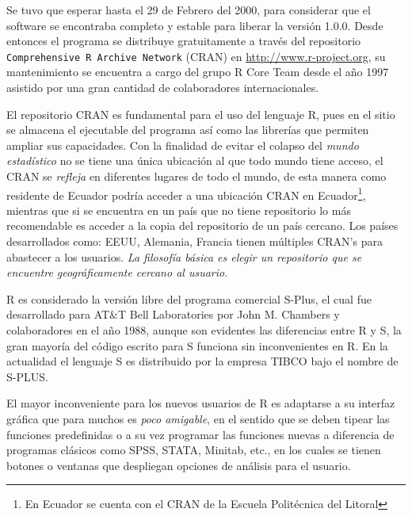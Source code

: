 \documentclass[11pt,a4paper,oneside]{book}\usepackage[]{graphicx}\usepackage[]{color}
\begin{document}
Se tuvo que esperar hasta el 29 de Febrero del 2000, para considerar que el software se encontraba completo y estable para liberar la versión 1.0.0. Desde entonces el programa se distribuye gratuitamente a través del repositorio \texttt{Comprehensive R Archive Network} (CRAN) en \url{http://www.r-project.org}, su mantenimiento se encuentra a cargo del grupo R Core Team desde el año 1997 asistido por una gran cantidad de colaboradores internacionales.\newline

El repositorio CRAN es fundamental para el uso del lenguaje R, pues en el sitio se almacena el ejecutable del programa así como las librerías que permiten ampliar sus capacidades. Con la finalidad de evitar el colapso del \emph{mundo estadístico} no se tiene una única ubicación al que todo mundo tiene acceso, el CRAN se \emph{refleja} en diferentes lugares de todo el mundo, de esta manera como residente de Ecuador podría acceder a una ubicación CRAN en Ecuador\footnote{En Ecuador se cuenta con el CRAN de la Escuela Politécnica del Litoral}, mientras que si se encuentra en un país que no tiene repositorio lo más recomendable es acceder a la copia del repositorio de un país cercano. Los países desarrollados como: EEUU, Alemania, Francia tienen múltiples CRAN's para abastecer a los usuarios. \emph{La filosofía básica es elegir un repositorio que se encuentre geográficamente cercano al usuario}.\newline 

R es considerado la versión libre del programa comercial S-Plus, el cual fue desarrollado para AT$\&$T Bell Laboratories por John M. Chambers y colaboradores en el año 1988, aunque son evidentes las diferencias entre R y S, la gran mayoría del código escrito para S funciona sin inconvenientes en R. En la actualidad el lenguaje S es distribuido por la empresa TIBCO bajo el nombre de S-PLUS.\newline

El mayor inconveniente para los nuevos usuarios de R es adaptarse a su interfaz gráfica que para muchos es \emph{poco amigable}, en el sentido que se deben tipear las funciones predefinidas o a su vez programar las funciones nuevas a diferencia de programas clásicos como SPSS, STATA, Minitab, etc., en los cuales se tienen botones o ventanas que despliegan opciones de análisis para el usuario. \newline
\end{document}

